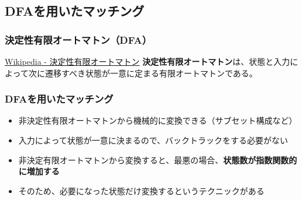 \documentclass[12pt, unicode, svgnames]{beamer}
\begin{document}
\subsection{DFAを用いたマッチング}
\begin{frame}[fragile]
  \frametitle{決定性有限オートマトン（DFA）}
  
  \begin{block}{}
    \begin{shadequote}[r]{\scriptsize\href{https://ja.wikipedia.org/wiki/\%E5\%B1\%BA\%E5\%AE\%9A\%E6\%80\%A7\%E6\%9C\%89\%E9\%99\%90\%E3\%82\%AA\%E3\%83\%BC\%E3\%83\%88\%E3\%83\%9E\%E3\%83\%88\%E3\%83\%B3}{Wikipedia - 決定性有限オートマトン}}
      \textbf{決定性有限オートマトン}は、状態と入力によって次に遷移すべき状態が一意に定まる有限オートマトンである。
    \end{shadequote}
  \end{block}

\end{frame}

\begin{frame}[fragile]
  \frametitle{DFAを用いたマッチング}
  
  \begin{itemize}
    \item<1-> 非決定性有限オートマトンから機械的に変換できる（サブセット構成など）
    \item<2-> 入力によって状態が一意に決まるので、バックトラックをする必要がない
    \item<3-> 非決定有限オートマトンから変換すると、最悪の場合、\textbf{状態数が指数関数的に増加する}
    \item<4-> そのため、必要になった状態だけ変換するというテクニックがある
  \end{itemize}
\end{frame}
\end{document}
